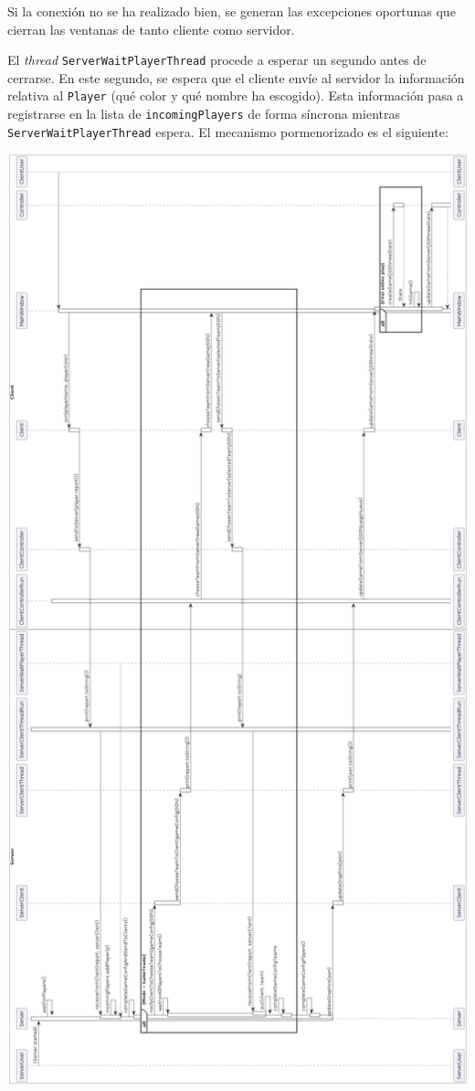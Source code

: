 \documentclass[../DocumentoOficial.tex]{subfiles}
\begin{document}
Si la conexión no se ha realizado bien, se generan las excepciones oportunas que cierran las ventanas de tanto cliente como servidor.

El \textit{thread} \texttt{ServerWaitPlayerThread} procede a esperar un segundo antes de cerrarse. En este segundo, se espera que el cliente envíe al servidor la información relativa al \texttt{Player} (qué color y qué nombre ha escogido). Esta información pasa a registrarse en la lista de \texttt{incomingPlayers} de forma síncrona mientras \texttt{ServerWaitPlayerThread} espera. El mecanismo pormenorizado es el siguiente:

\begin{center}
\includegraphics[scale=0.37]{empezarPartidaUmlSprint7.png}
\end{center}
\end{document}
